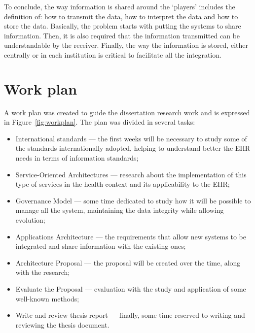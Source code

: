 To conclude, the way information is shared around the `players' includes the definition of: how to transmit the data, how to interpret the data and how to store the data. Basically, the problem starts with putting the systems to share information. Then, it is also required that the information transmitted can be understandable by the receiver. Finally, the way the information is stored, either centrally or in each institution is critical to facilitate all the integration.


\section{Work plan}

A work plan was created to guide the dissertation research work and is expressed in Figure~\ref{fig:workplan}.
The plan was divided in several tasks:
\begin{itemize}
\item International standards --- the first weeks will be necessary to study some of the standards internationally adopted, helping to understand better the EHR needs in terms of information standards;
\item Service-Oriented Architectures --- research about the implementation of this type of services in the health context and its applicability to the EHR;
\item Governance Model --- some time dedicated to study how it will be possible to manage all the system, maintaining the data integrity while allowing evolution;
\item Applications Architecture --- the requirements that allow new systems to be integrated and share information with the existing ones;
\item Architecture Proposal --- the proposal will be created over the time, along with the research;
\item Evaluate the Proposal --- evaluation with the study and application of some well-known methods;
\item Write and review thesis report --- finally, some time reserved to writing and reviewing the thesis document.
\end{itemize}

